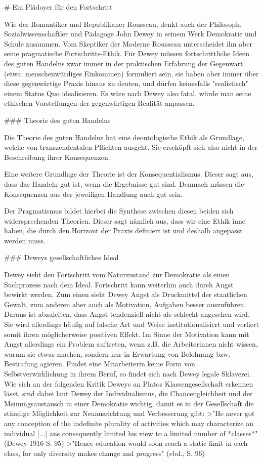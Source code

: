 # Ein Plädoyer für den Fortschritt

Wie der Romantiker und Republikaner Rousseau, denkt auch der Philosoph,
Sozialwissenschaftler und Pädagoge John Dewey in seinem Werk Demokratie und Schule zusammen.
Vom Skeptiker der Moderne Rousseau unterscheidet ihn aber seine pragmatische Fortschritts-Ethik.
Für Dewey müssen fortschrittliche Ideen des guten Handelns zwar immer in der  praktischen Erfahrung der Gegenwart (etwa: menschenwürdiges Einkommen) formuliert sein, sie haben aber immer über diese gegenwärtige Praxis hinaus zu deuten, und dürfen keinesfalls "realistisch" einem Status Quo idealisieren.
Es wäre nach Dewey also fatal, würde man seine ethischen Vorstellungen der gegenwärtigen Realität anpassen.

### Theorie des guten Handelns

Die Theorie des guten Handelns hat eine deontologische Ethik als Grundlage, welche von transzendentalen Pflichten ausgeht.
Sie erschöpft sich also nicht in der Beschreibung ihrer Konsequenzen.

Eine weitere Grundlage der Theorie ist der Konsequentialismus.
Dieser sagt aus, dass das Handeln gut ist, wenn die Ergebnisse gut sind.
Demnach müssen die Konsequenzen aus der jeweiligen Handlung auch gut sein.

Der Pragmatismus bildet hierbei die Synthese zwischen diesen beiden sich widersprechenden Theorien.
Dieser sagt nämlich aus, dass wir eine Ethik inne haben, die durch den Horizont der Praxis definiert ist und deshalb angepasst werden muss.

### Deweys gesellschaftliches Ideal

Dewey sieht den Fortschritt vom Naturzustand zur Demokratie als einen Suchprozess nach dem Ideal.
Fortschritt kann weiterhin auch durch Angst bewirkt werden.
Zum einen sieht Dewey Angst als Druckmittel der staatlichen Gewalt, zum anderen aber auch als Motivation, Aufgaben besser auszuführen.
Daraus ist abzuleiten, dass Angst tendenziell nicht als schlecht angesehen wird.
Sie wird allerdings häufig auf falsche Art und Weise institutionalisiert und verliert somit ihren möglicherweise positiven Effekt.
Im Sinne der Motivation kann mit Angst allerdings ein Problem auftreten, wenn z.B. die Arbeiterinnen nicht wissen, warum sie etwas machen, sondern nur in Erwartung von Belohnung bzw. Bestrafung agieren.
Findet eine Mitarbeiterin keine Form von Selbstverwirklichung in ihrem Beruf, so findet sich nach Dewey legale Sklaverei.
Wie sich an der folgenden Kritik Deweys an Platos Klassengesellschaft erkennen lässt, sind dabei laut Dewey der Individualismus, die Chancengleichheit und der Meinungsaustausch in einer Demokratie wichtig, damit es in der Gesellschaft die ständige Möglichkeit zur Neuausrichtung und Verbesserung gibt:
>"He never got any conception of the indefinite plurality of activities which may characterize an individual [...] ans consequently limited his view to a limited number of *classes*" (Dewey-1916 S. 95)
>"Hence education would soon reach a static limit in each class, for only diversity makes change and progress" (ebd., S. 96)

